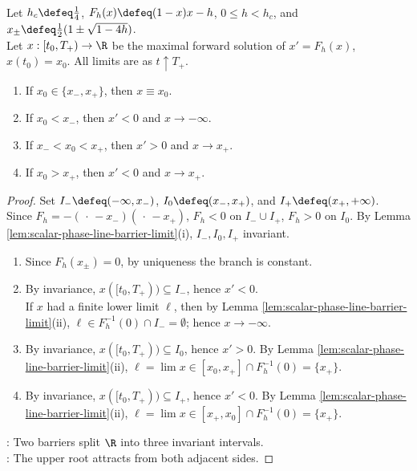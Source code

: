 \begin{theorem} \label{thm:subcritical-harvest-phase-line} \\
Let $h_c\defeq\frac14$, $F_h(x)\defeq(1-x)x-h$, $0\leq h<h_c$, and $x_\pm\defeq\frac12(1\pm\sqrt{1-4h})$.\\
Let $x:[t_0,T_+)\to\R$ be the maximal forward solution of $x'=F_h(x)$, $x(t_0)=x_0$. All limits are as $t\uparrow T_+$.
\begin{enumerate}[label=(\roman*)]
\setlength{\itemsep}{0pt}
\item If $x_0\in\{x_-,x_+\}$, then $x\equiv x_0$.
\item If $x_0<x_-$, then $x'<0$ and $x\to-\infty$.
\item If $x_-<x_0<x_+$, then $x'>0$ and $x\to x_+$.
\item If $x_0>x_+$, then $x'<0$ and $x\to x_+$.
\end{enumerate}
\begin{proof}
Set $I_-\defeq(-\infty,x_-)$, $I_0\defeq(x_-,x_+)$, and $I_+\defeq(x_+,+\infty)$.\\
Since $F_h=-(\,\cdot\,-x_-)(\,\cdot\,-x_+)$, $F_h<0$ on $I_-\cup I_+$, $F_h>0$ on $I_0$. By Lemma \ref{lem:scalar-phase-line-barrier-limit}(i), $I_-,I_0,I_+$ invariant.
\begin{enumerate}[label=(\roman*)]
\setlength{\itemsep}{0pt}
\item Since $F_h(x_\pm)=0$, by uniqueness the branch is constant.
\item By invariance, $x([t_0,T_+))\subseteq I_-$, hence $x'<0$.\\
If $x$ had a finite lower limit $\ell$, then by Lemma \ref{lem:scalar-phase-line-barrier-limit}(ii), $\ell\in F_h^{-1}(0)\cap I_-=\emptyset$; hence $x\to-\infty$.
\item By invariance, $x([t_0,T_+))\subseteq I_0$, hence $x'>0$. By Lemma \ref{lem:scalar-phase-line-barrier-limit}(ii), $\ell=\lim x\in[x_0,x_+]\cap F_h^{-1}(0)=\{x_+\}$.
\item By invariance, $x([t_0,T_+))\subseteq I_+$, hence $x'<0$. By Lemma \ref{lem:scalar-phase-line-barrier-limit}(ii), $\ell=\lim x\in[x_+,x_0]\cap F_h^{-1}(0)=\{x_+\}$.
\end{enumerate}
: Two barriers split $\R$ into three invariant intervals.\\
: The upper root attracts from both adjacent sides.
\end{proof}
\end{theorem}

